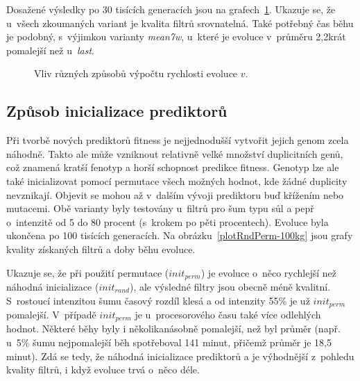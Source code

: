 Dosažené výsledky po 30 tisících generacích jsou na grafech~\ref{plotBwalg-30kg}. Ukazuje se, že u~všech zkoumaných variant je kvalita filtrů srovnatelná. Také potřebný čas běhu je podobný, s~výjimkou varianty \emph{mean7w}, u~které je evoluce v~průměru 2,2krát pomalejší než u~\emph{last}.

\begin{figure}[htb]
    \centering
    \captionsetup{aboveskip=0pt}
    \caption{Vliv různých způsobů výpočtu rychlosti evoluce $v$.}
    \label{plotBwalg-30kg}
\end{figure}

\subsection{Způsob inicializace prediktorů}

Při tvorbě nových prediktorů fitness je nejjednodušší vytvořit jejich genom zcela náhodně. Takto ale může vzniknout relativně velké množství duplicitních genů, což znamená kratší fenotyp a horší schopnost predikce fitness. Genotyp lze ale také inicializovat pomocí permutace všech možných hodnot, kde žádné duplicity nevznikají. Objevit se mohou až v~dalším vývoji prediktoru buď křížením nebo mutacemi. Obě varianty byly testovány u~filtrů pro šum typu sůl a pepř o~intenzitě od 5 do 80 procent (s~krokem po pěti procentech). Evoluce byla ukončena po 100 tisících generacích. Na obrázku~\ref{plotRndPerm-100kg} jsou grafy kvality získaných filtrů a doby běhu evoluce.

Ukazuje se, že při použití permutace ($\mathit{init}_\mathit{perm}$) je evoluce o~něco rychlejší než náhodná inicializace ($\mathit{init}_\mathit{rand}$), ale výsledné filtry jsou obecně méně kvalitní. S~rostoucí intenzitou šumu časový rozdíl klesá a od intenzity 55\% je už $\mathit{init}_\mathit{perm}$ pomalejší. V~případě $\mathit{init}_\mathit{perm}$ je u~procesorového času také více odlehlých hodnot. Některé běhy byly i několikanásobně pomalejší, než byl průměr (např. u~5\% šumu nejpomalejší běh spotřeboval 141 minut, přičemž průměr je 18,5 minut). Zdá se tedy, že náhodná inicializace prediktorů a je výhodnější z~pohledu kvality filtrů, i když evoluce trvá o~něco déle.

